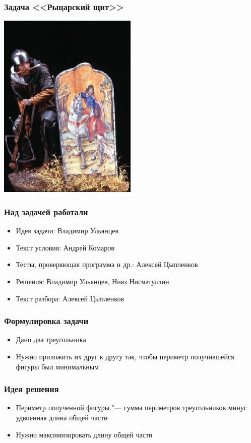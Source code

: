 \begin{frame}
  \frametitle{Задача <<Рыцарский щит>>}
  \begin{center}
    \includegraphics[height=9cm]{shield-11.eps}
  \end{center}
\end{frame}

\begin{frame}
  \frametitle{Над задачей работали}
  \begin{itemize}
    \item Идея задачи: Владимир Ульянцев
    \item Текст условия: Андрей Комаров
    \item Тесты, проверяющая программа и др.: Алексей Цыпленков
    \item Решения: Владимир Ульянцев, Нияз Нигматуллин
    \item Текст разбора: Алексей Цыпленков
  \end{itemize}
\end{frame}

\begin{frame}
  \frametitle{Формулировка задачи}
  \begin{itemize}
    \item
      Дано два треугольника
    \item
      Нужно приложить их друг к другу так, чтобы периметр получившейся фигуры был минимальным
  \end{itemize}
\end{frame}

\begin{frame}
  \frametitle{Идея решения}
  \begin{itemize}
    \item Периметр полученной фигуры "--- сумма периметров треугольников минус удвоенная длина общей части
    \item Нужно максимизировать длину общей части
  \end{itemize}
\end{frame}
              
